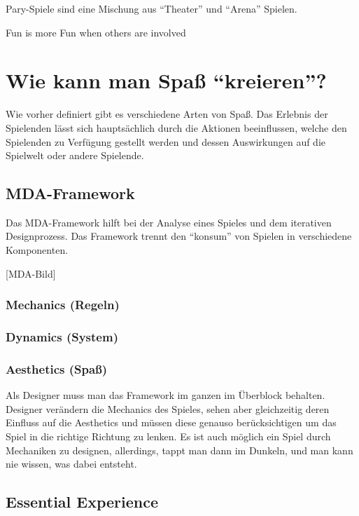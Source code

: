 Pary-Spiele sind eine Mischung aus "`Theater"' und "`Arena"' Spielen\cite[S. 65]{_art_of_gamedesign}. 

Fun is more Fun when others are involved

\section{Wie kann man Spaß "`kreieren"'?}

Wie vorher definiert gibt es verschiedene Arten von Spaß. Das Erlebnis der Spielenden lässt sich hauptsächlich durch die Aktionen beeinflussen, welche den Spielenden zu Verfügung gestellt werden und dessen Auswirkungen auf die Spielwelt oder andere Spielende.

\subsection{MDA-Framework}

Das MDA-Framework hilft bei der Analyse eines Spieles und dem iterativen Designprozess. Das Framework trennt den "`konsum"' von Spielen in verschiedene Komponenten. \cite{_mda}

[MDA-Bild]

\subsubsection{Mechanics (Regeln)}

\subsubsection{Dynamics (System)}

\subsubsection{Aesthetics (Spaß)}

Als Designer muss man das Framework im ganzen im Überblock behalten. Designer verändern die Mechanics des Spieles, sehen aber gleichzeitig deren Einfluss auf die Aesthetics und müssen diese genauso berücksichtigen um das Spiel in die richtige Richtung zu lenken. 
Es ist auch möglich ein Spiel durch Mechaniken zu designen, allerdings, tappt man dann im Dunkeln, und man kann nie wissen, was dabei entsteht. \cite[S.56]{_art_of_gamedesign}

\subsection{Essential Experience}

